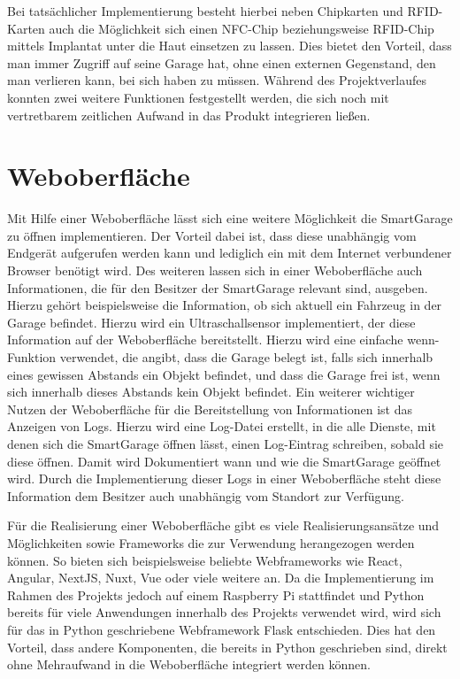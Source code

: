 Bei tatsächlicher Implementierung besteht hierbei neben Chipkarten und RFID-Karten auch die Möglichkeit sich einen NFC-Chip beziehungsweise RFID-Chip mittels Implantat unter die Haut einsetzen zu lassen. Dies bietet den Vorteil, dass man immer Zugriff auf seine Garage hat, ohne einen externen Gegenstand, den man verlieren kann, bei sich haben zu müssen.
Während des Projektverlaufes konnten zwei weitere Funktionen festgestellt werden, die sich noch mit vertretbarem zeitlichen Aufwand in das Produkt integrieren ließen.

\section{Weboberfläche}
Mit Hilfe einer Weboberfläche lässt sich eine weitere Möglichkeit die SmartGarage zu öffnen implementieren. Der Vorteil dabei ist, dass diese unabhängig vom Endgerät aufgerufen werden kann und lediglich ein mit dem Internet verbundener Browser benötigt wird. Des weiteren lassen sich in einer Weboberfläche auch Informationen, die für den Besitzer der SmartGarage relevant sind, ausgeben. Hierzu gehört beispielsweise die Information, ob sich aktuell ein Fahrzeug in der Garage befindet. Hierzu wird ein Ultraschallsensor implementiert, der diese Information auf der Weboberfläche bereitstellt. Hierzu wird eine einfache wenn-Funktion verwendet, die angibt, dass die Garage belegt ist, falls sich innerhalb eines gewissen Abstands ein Objekt befindet, und dass die Garage frei ist, wenn sich innerhalb dieses Abstands kein Objekt befindet.
Ein weiterer wichtiger Nutzen der Weboberfläche für die Bereitstellung von Informationen ist das Anzeigen von Logs. Hierzu wird eine Log-Datei erstellt, in die alle Dienste, mit denen sich die SmartGarage öffnen lässt, einen Log-Eintrag schreiben, sobald sie diese öffnen. Damit wird Dokumentiert wann und wie die SmartGarage geöffnet wird. Durch die Implementierung dieser Logs in einer Weboberfläche steht diese Information dem Besitzer auch unabhängig vom Standort zur Verfügung.

Für die Realisierung einer Weboberfläche gibt es viele Realisierungsansätze und Möglichkeiten sowie Frameworks die zur Verwendung herangezogen werden können. So bieten sich beispielsweise beliebte Webframeworks wie React, Angular, NextJS, Nuxt, Vue oder viele weitere an. Da die Implementierung im Rahmen des Projekts jedoch auf einem Raspberry Pi stattfindet und Python bereits für viele Anwendungen innerhalb des Projekts verwendet wird, wird sich für das in Python geschriebene Webframework Flask entschieden. Dies hat den Vorteil, dass andere Komponenten, die bereits in Python geschrieben sind, direkt ohne Mehraufwand in die Weboberfläche integriert werden können.

